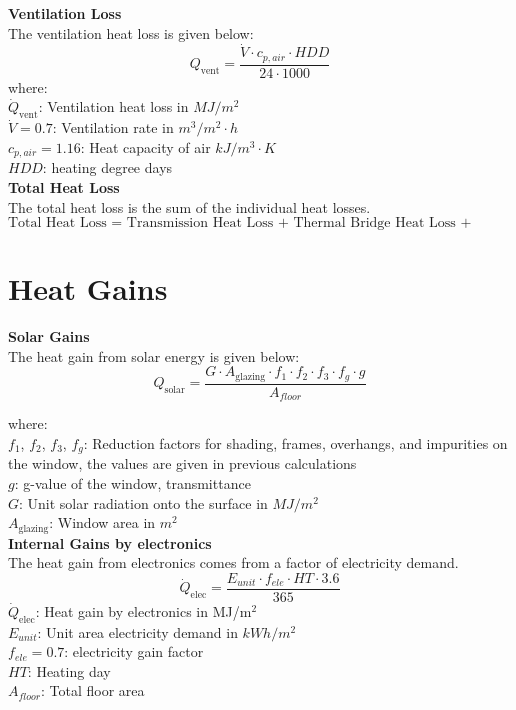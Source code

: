\documentclass[a4paper, oneside]{discothesis}
\begin{document}
	\textbf{Ventilation Loss}\\
		The ventilation heat loss is given below:\\
		\[Q_{\text{vent}} = \frac{\dot{V} \cdot c_{p,air} \cdot HDD}{24 \cdot 1000}\]
		where:\\
		$\dot{Q}_{\text{vent}}$: Ventilation heat loss in $MJ/m^2$\\
		$\dot{V} = 0.7$: Ventilation rate in $m^3/m^2\cdot h$\\
		$c_{p,air} = 1.16$: Heat capacity of air $kJ/m^3 \cdot K$\\
		$HDD$: heating degree days\\
	
	\textbf{Total Heat Loss}\\
	The total heat loss is the sum of the individual heat losses.
	\[\text{Total Heat Loss = Transmission Heat Loss + Thermal Bridge Heat Loss + Ventilation Loss}\]
	\newpage
	\section{Heat Gains}
	\textbf{Solar Gains}\\
	The heat gain from solar energy is given below: \\
	\[Q_{\text{solar}} = \frac{G \cdot A_{\text{glazing}} \cdot f_1 \cdot f_2 \cdot f_3 \cdot f_g \cdot g}{A_{floor}} \]

	where:\\
	$f_1$, $f_2$, $f_3$, $f_g$: Reduction factors for shading, frames, overhangs, and impurities on the window, the values are given in previous calculations\\
	$g$: g-value of the window, transmittance\\
	$G$: Unit solar radiation onto the surface in $MJ/m^2$\\
	$A_{\text{glazing}}$: Window area in $m^2$\\

	
	\textbf{Internal Gains by electronics}\\
	The heat gain from electronics comes from a factor of electricity demand.
	\[\dot{Q}_{\text{elec}} = \frac{E_{unit}  \cdot f_{ele} \cdot HT \cdot 3.6}{365} \]
	$\dot{Q}_{\text{elec}}$: Heat gain by electronics in MJ/m$^2$\\
	$E_{unit}$: Unit area electricity demand in $kWh/m^2$\\
	$f_{ele} = 0.7$: electricity gain factor\\
	$HT$: Heating day\\
	$A_{floor}$: Total floor area\\
\end{document}
